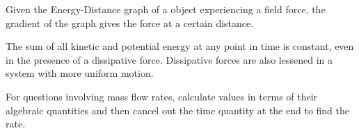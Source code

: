 \documentclass[../main]{subfiles}
\begin{document}
Given the Energy-Distance graph of a object experiencing a field force, the gradient of the graph gives the force at a certain distance.


The sum of all kinetic and potential energy at any point in time is constant, even in the presence of a dissipative force. Dissipative forces are also lessened in a system with more uniform motion.



For questions involving mass flow rates, calculate values in terms of their algebraic quantities and then cancel out the time quantity at the end to find the rate.
\end{document}
